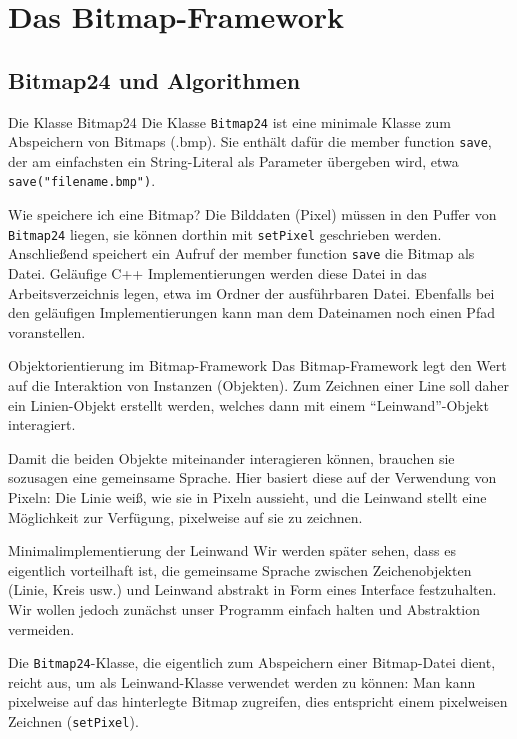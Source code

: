 \section{Das Bitmap-Framework}

\subsection{Bitmap24 und Algorithmen}

\begin{frame}[fragile]{Die Klasse Bitmap24}
	Die Klasse \verb|Bitmap24| ist eine minimale Klasse zum Abspeichern von Bitmaps (.bmp). Sie enthält dafür die member function \verb|save|, der am einfachsten ein String-Literal als Parameter übergeben wird, etwa \verb|save("filename.bmp")|.
	
	\pause
	
	\begin{block}{Wie speichere ich eine Bitmap?}
		Die Bilddaten (Pixel) müssen in den Puffer von \verb|Bitmap24| liegen, sie können dorthin mit \verb|setPixel| geschrieben werden. Anschließend speichert ein Aufruf der member function \verb|save| die Bitmap als Datei. Geläufige C++ Implementierungen werden diese Datei in das Arbeitsverzeichnis legen, etwa im Ordner der ausführbaren Datei. Ebenfalls bei den geläufigen Implementierungen kann man dem Dateinamen noch einen Pfad voranstellen.
	\end{block}
\end{frame}

\begin{frame}{Objektorientierung im Bitmap-Framework}
	Das Bitmap-Framework legt den Wert auf die Interaktion von Instanzen (Objekten). Zum Zeichnen einer Line soll daher ein Linien-Objekt erstellt werden, welches dann mit einem \enquote{Leinwand}-Objekt interagiert.
	
	\pause
	\vspace{1em}
	
	Damit die beiden Objekte miteinander interagieren können, brauchen sie sozusagen eine gemeinsame Sprache. Hier basiert diese auf der Verwendung von Pixeln: Die Linie weiß, wie sie in Pixeln aussieht, und die Leinwand stellt eine Möglichkeit zur Verfügung, pixelweise auf sie zu zeichnen.
\end{frame}

\begin{frame}[fragile]{Minimalimplementierung der Leinwand}
	Wir werden später sehen, dass es eigentlich vorteilhaft ist, die gemeinsame Sprache zwischen Zeichenobjekten (Linie, Kreis usw.) und Leinwand abstrakt in Form eines Interface festzuhalten. Wir wollen jedoch zunächst unser Programm einfach halten und Abstraktion vermeiden.
	
	\pause
	\vspace{1em}
	
	Die \verb|Bitmap24|-Klasse, die eigentlich zum Abspeichern einer Bitmap-Datei dient, reicht aus, um als Leinwand-Klasse verwendet werden zu können: Man kann pixelweise auf das hinterlegte Bitmap zugreifen, dies entspricht einem pixelweisen Zeichnen (\verb|setPixel|).
\end{frame}

